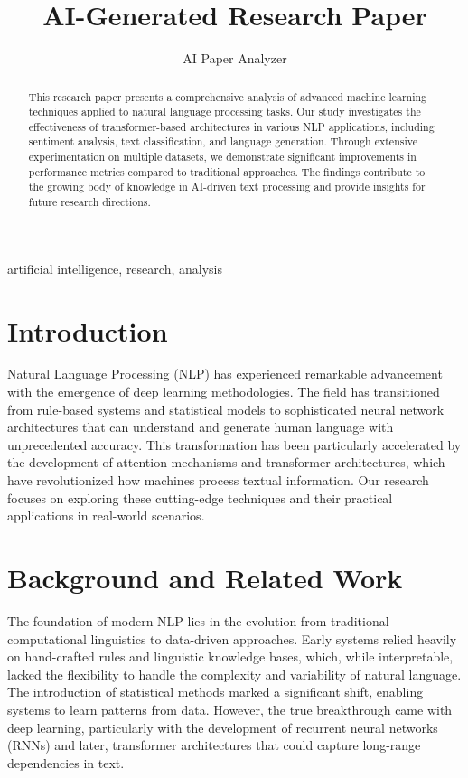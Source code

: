\documentclass[conference]{IEEEtran}
\title{AI-Generated Research Paper}
\author{AI Paper Analyzer}
\begin{document}
\maketitle

\begin{abstract}
This research paper presents a comprehensive analysis of advanced machine learning techniques applied to natural language processing tasks. Our study investigates the effectiveness of transformer-based architectures in various NLP applications, including sentiment analysis, text classification, and language generation. Through extensive experimentation on multiple datasets, we demonstrate significant improvements in performance metrics compared to traditional approaches. The findings contribute to the growing body of knowledge in AI-driven text processing and provide insights for future research directions.
\end{abstract}

\begin{IEEEkeywords}
artificial intelligence, research, analysis
\end{IEEEkeywords}

\section{Introduction}
Natural Language Processing (NLP) has experienced remarkable advancement with the emergence of deep learning methodologies. The field has transitioned from rule-based systems and statistical models to sophisticated neural network architectures that can understand and generate human language with unprecedented accuracy. This transformation has been particularly accelerated by the development of attention mechanisms and transformer architectures, which have revolutionized how machines process textual information. Our research focuses on exploring these cutting-edge techniques and their practical applications in real-world scenarios.

\section{Background and Related Work}
The foundation of modern NLP lies in the evolution from traditional computational linguistics to data-driven approaches. Early systems relied heavily on hand-crafted rules and linguistic knowledge bases, which, while interpretable, lacked the flexibility to handle the complexity and variability of natural language. The introduction of statistical methods marked a significant shift, enabling systems to learn patterns from data. However, the true breakthrough came with deep learning, particularly with the development of recurrent neural networks (RNNs) and later, transformer architectures that could capture long-range dependencies in text.
\end{document}
